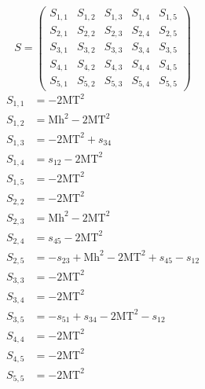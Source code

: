 \documentclass[a4paper]{article}
\begin{document}
\begin{equation}
S=\left(\begin{array}{ccccc}
   S_{1,1}&
   S_{1,2}&
   S_{1,3}&
   S_{1,4}&
   S_{1,5}\\
   S_{2,1}&
   S_{2,2}&
   S_{2,3}&
   S_{2,4}&
   S_{2,5}\\
   S_{3,1}&
   S_{3,2}&
   S_{3,3}&
   S_{3,4}&
   S_{3,5}\\
   S_{4,1}&
   S_{4,2}&
   S_{4,3}&
   S_{4,4}&
   S_{4,5}\\
   S_{5,1}&
   S_{5,2}&
   S_{5,3}&
   S_{5,4}&
   S_{5,5}\end{array}\right)
\end{equation}
\begin{subequations}
\begin{align}
   S_{1,1}&=-2\text{MT}^2\\
   S_{1,2}&=\text{Mh}^2-2\text{MT}^2\\
   S_{1,3}&=-2\text{MT}^2+s_{34}\\
   S_{1,4}&=s_{12}-2\text{MT}^2\\
   S_{1,5}&=-2\text{MT}^2\\
   S_{2,2}&=-2\text{MT}^2\\
   S_{2,3}&=\text{Mh}^2-2\text{MT}^2\\
   S_{2,4}&=s_{45}-2\text{MT}^2\\
   S_{2,5}&=-s_{23}+\text{Mh}^2-2\text{MT}^2+s_{45}-s_{12}\\
   S_{3,3}&=-2\text{MT}^2\\
   S_{3,4}&=-2\text{MT}^2\\
   S_{3,5}&=-s_{51}+s_{34}-2\text{MT}^2-s_{12}\\
   S_{4,4}&=-2\text{MT}^2\\
   S_{4,5}&=-2\text{MT}^2\\
   S_{5,5}&=-2\text{MT}^2
\end{align}
\end{subequations}
\end{document}
